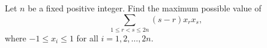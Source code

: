 Let $n$ be a fixed positive integer. Find the maximum possible value of
\[
\sum_{1 \leq r < s \leq 2n} (s - r) x_r x_s,
\]
where $-1 \leq x_i \leq 1$ for all $i = 1, 2, \ldots, 2n$.
